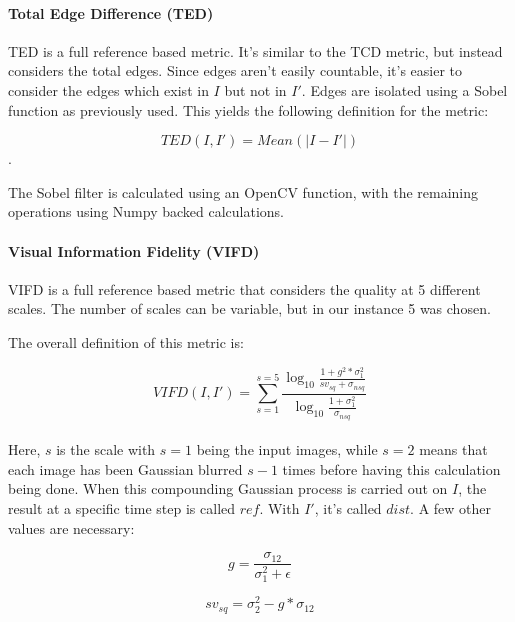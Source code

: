 \documentclass[10pt,a4paper]{article}
\begin{document}
            \paragraph{Total Edge Difference (TED)}
                TED is a full reference based metric. It's similar to the TCD metric, but instead considers the total edges.
                Since edges aren't easily countable, it's easier to consider the edges which exist in $I$ but not in $I'$. 
                Edges are isolated using a Sobel function as previously used. This yields the following definition for the metric:

                $$TED(I, I') = Mean(|I - I'|)$$.

                The Sobel filter is calculated using an OpenCV function, with the remaining operations using Numpy backed calculations.

            \paragraph{Visual Information Fidelity (VIFD)}
                VIFD is a full reference based metric that considers the quality at 5 different scales. The number of scales can be variable, but in our instance 5 was chosen.

                The overall definition of this metric is:

                $$VIFD(I, I') = \sum_{s = 1}^{s=5} \frac{
                        \log_{10} 
                        \frac{1 + g^2 * \sigma_{1}^2}
                        {sv_{sq} + \sigma_{nsq}}
                    }{
                        \log_{10}
                        \frac{1 + \sigma_{1}^2}
                        {\sigma_{nsq}}
                    }$$\\

                Here, $s$ is the scale with $s=1$ being the input images, while $s=2$ means that each image has been Gaussian blurred $s-1$ times before having this calculation being done.
                When this compounding Gaussian process is carried out on $I$, the result at a specific time step is called $ref$. With $I'$, it's called $dist$.
                A few other values are necessary:


                $$g = \frac{\sigma_{12}}{\sigma_{1}^2 + \epsilon}$$
                
                $$sv_{sq} = \sigma_{2}^2 - g*\sigma_{12}$$
\end{document}

